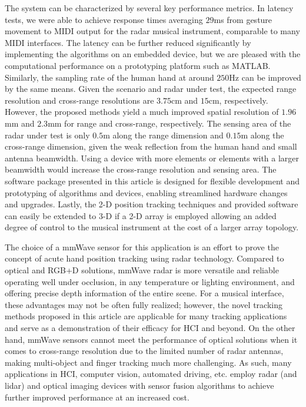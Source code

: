 \documentclass[10pt,journal,final]{IEEEtran}
\begin{document}
The system can be characterized by several key performance metrics. In latency tests, we were able to achieve response times averaging $29$ms from gesture movement to MIDI output for the radar musical instrument, comparable to many MIDI interfaces. The latency can be further reduced significantly by implementing the algorithms on an embedded device, but we are pleased with the computational performance on a prototyping platform such as MATLAB. Similarly, the sampling rate of the human hand at around $250$Hz can be improved by the same means. Given the scenario and radar under test, the expected range resolution and cross-range resolutions are $3.75$cm and $15$cm, respectively. However, the proposed methods yield a much improved spatial resolution of $1.96$mm and $2.3$mm for range and cross-range, respectively. The sensing area of the radar under test is only $0.5$m along the range dimension and $0.15$m along the cross-range dimension, given the weak reflection from the human hand and small antenna beamwidth. Using a device with more elements or elements with a larger beamwidth would increase the cross-range resolution and sensing area. The software package presented in this article is designed for flexible development and prototyping of algorithms and devices, enabling streamlined hardware changes and upgrades. Lastly, the 2-D position tracking techniques and provided software can easily be extended to 3-D if a 2-D array is employed allowing an added degree of control to the musical instrument at the cost of a larger array topology.

The choice of a mmWave sensor for this application is an effort to prove the concept of acute hand position tracking using radar technology. Compared to optical and RGB+D solutions, mmWave radar is more versatile and reliable operating well under occlusion, in any temperature or lighting environment, and offering precise depth information of the entire scene. For a musical interface, these advantages may not be often fully realized; however, the novel tracking methods proposed in this article are applicable for many tracking applications and serve as a demonstration of their efficacy for HCI and beyond. On the other hand, mmWave sensors cannot meet the performance of optical solutions when it comes to cross-range resolution due to the limited number of radar antennas, making multi-object and finger tracking much more challenging. As such, many applications in HCI, computer vision, automated driving, etc. employ radar (and lidar) and optical imaging devices with sensor fusion algorithms to achieve further improved performance at an increased cost. 
\end{document}
